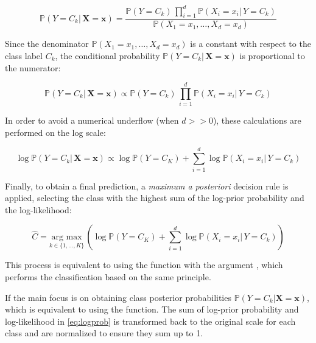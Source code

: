 \documentclass{article}\usepackage[]{graphicx}\usepackage[]{xcolor}
\begin{document}
\begin{equation}
 \mathbb{P}(Y = C_k | \, \boldsymbol{X} = \boldsymbol{x}) =  \frac{\mathbb{P}(Y = C_k) \, \prod_{i=1}^d \mathbb{P}(X_i = x_i | \, Y = C_k)}{ \mathbb{P}(X_1 = x_1,\ldots, X_d = x_d)}
\end{equation}


Since the denominator $\mathbb{P}(X_1 = x_1,\ldots, X_d = x_d)$ is a constant with respect to the class label $C_k$, the conditional probability $\mathbb{P}(Y = C_k | \, \boldsymbol{X} = \boldsymbol{x})$ is proportional to the numerator:


\begin{equation}
\label{eq:eq3}
\mathbb{P}(Y = C_k | \, \boldsymbol{X} = \boldsymbol{x}) \propto \mathbb{P}(Y = C_k) \, \prod_{i=1}^d \mathbb{P}(X_i = x_i | \, Y = C_k)
\end{equation}


In order to avoid a numerical underflow (when $d >> 0$), these calculations are performed on the log scale:


\begin{equation}
\label{eq:logprob}
\log \mathbb{P}(Y = C_k | \, \boldsymbol{X} = \boldsymbol{x}) \propto  \log \mathbb{P}(Y = C_K) + \sum_{i=1}^d \log \mathbb{P}(X_i = x_i | \, Y = C_k)
\end{equation}


Finally, to obtain a final prediction, a \emph{maximum a posteriori} decision rule is applied, selecting the class with the highest sum of the log-prior probability and the log-likelihood:

\begin{equation}
\hat{C} = \underset{k \in \{1,\ldots,K \}}{\text{arg max}} \, \left( \log \mathbb{P}(Y = C_K) + \sum_{i=1}^d \log \mathbb{P}(X_i = x_i | \, Y = C_k) \right)
\end{equation}

This process is equivalent to using the \textcolor{darkgreen}{{}} function with the argument \textcolor{darkgreen}{{}}, which performs the classification based on the same principle.

\vspace{3mm}

If the main focus is on obtaining class posterior probabilities $\mathbb{P}(Y = C_k | \boldsymbol{X} = \boldsymbol{x})$, which is equivalent to using the \textcolor{darkgreen}{{}} function. The sum of log-prior probability and log-likelihood in \eqref{eq:logprob} is transformed back to the original scale for each class and are normalized to ensure they sum up to 1.
\end{document}

